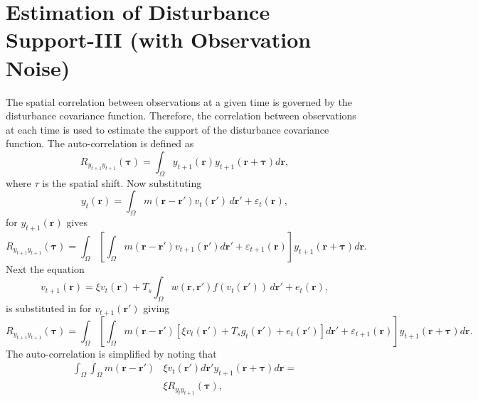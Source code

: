 \documentclass[]{article}
\begin{document}
\section*{Estimation of Disturbance Support-III (with Observation Noise)}
The spatial correlation between observations at a given time is governed by the disturbance covariance function. Therefore, the correlation between observations at each time is used to estimate the support of the disturbance covariance function. The auto-correlation is defined as
\begin{equation}
	R_{y_{t+1}y_{t+1}}(\boldsymbol{\tau}) = \int_{\Omega} y_{t+1}(\mathbf{r}) y_{t+1}(\mathbf{r}+\boldsymbol{\tau}) d\mathbf{r},
\end{equation}
where $\tau$ is the spatial shift. Now substituting 
\begin{equation}\label{eq:ObservationEquationNoisy}
	y_t(\mathbf{r}) = \int_{\Omega} { m\left(\mathbf{r}-\mathbf{r}'\right) v_t\left(\mathbf{r}'\right) \, d\mathbf{r}'} + \varepsilon_t(\mathbf{r}), 
\end{equation}
for  $y_{t+1}(\mathbf{r})$ gives 
\begin{equation}
	R_{y_{t+1}y_{t+1}}(\boldsymbol{\tau}) = \int_{\Omega}\left[ \int_{\Omega} m(\mathbf{r}-\mathbf{r}')v_{t+1}(\mathbf{r}')d\mathbf{r}' +\varepsilon_{t+1}(\mathbf{r})\right] y_{t+1}(\mathbf{r}+\boldsymbol{\tau}) d\mathbf{r}.
\end{equation}
Next the equation
\begin{equation}
	\label{eq:DiscreteTimeModelNoisy} 
	v_{t+1}\left(\mathbf{r}\right) = 
	\xi v_t\left(\mathbf{r}\right) + 
	T_s \int_\Omega { 
	    w\left(\mathbf{r},\mathbf{r}'\right)
	    f\left(v_t\left(\mathbf{r}'\right)\right) 
	\, d\mathbf{r}'} 
	+ e_t\left(\mathbf{r}\right), 
\end{equation}
is substituted in for  $v_{t+1}(\mathbf{r}')$ giving 
\begin{equation}
	R_{y_{t+1}y_{t+1}}(\boldsymbol{\tau}) = \int_{\Omega}\left[ \int_{\Omega} m(\mathbf{r}-\mathbf{r}')\left[ \xi v_t\left(\mathbf{r}'\right) + 
	T_s g_t(\mathbf{r}') 
	+ e_t\left(\mathbf{r}'\right)\right] d\mathbf{r}' +\varepsilon_{t+1}(\mathbf{r})\right] y_{t+1}(\mathbf{r}+\boldsymbol{\tau}) d\mathbf{r}.
\end{equation}
The auto-correlation is simplified by noting that
\begin{align}
	\int_{\Omega}\int_{\Omega} m(\mathbf{r}-\mathbf{r}')&\xi v_t(\mathbf{r}')d\mathbf{r}'y_{t+1}(\mathbf{r}+\boldsymbol{\tau}) d\mathbf{r} = \nonumber \\ 
 &\xi R_{y_ty_{t+1}}(\boldsymbol{\tau}),
\end{align}
\end{document}
